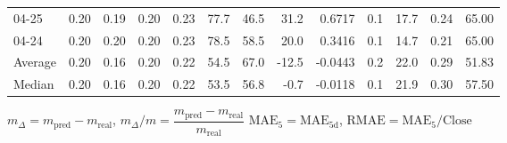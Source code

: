 \begin{threeparttable}
{\begin{tabular}{lrrrrrrrrrrrr}
  04-25 &          0.20 &          0.19 &          0.20 &        0.23 &                77.7 &                46.5 &       31.2 &       0.6717 &                 0.1 &             17.7 &            0.24 &                  65.00 \\
  04-24 &          0.20 &          0.20 &          0.20 &        0.23 &                78.5 &                58.5 &       20.0 &       0.3416 &                 0.1 &             14.7 &            0.21 &                  65.00 \\
Average &          0.20 &          0.16 &          0.20 &        0.22 &                54.5 &                67.0 &      -12.5 &      -0.0443 &                 0.2 &             22.0 &            0.29 &                  51.83 \\
 Median &          0.20 &          0.16 &          0.20 &        0.22 &                53.5 &                56.8 &       -0.7 &      -0.0118 &                 0.1 &             21.9 &            0.30 &                  57.50 \\
\bottomrule
\end{tabular}
}
\begin{tablenotes}\footnotesize
\item $m_\Delta=m_{\text{pred}}-m_{\text{real}}$,
$m_\Delta/m=\dfrac{m_{\text{pred}}-m_{\text{real}}}{m_{\text{real}}}$
$\mathrm{MAE}_5=\mathrm{MAE}_{5\text{d}}$,
$\mathrm{RMAE}=\mathrm{MAE}_5/\text{Close}$
\end{tablenotes}
\end{threeparttable}
\endgroup

